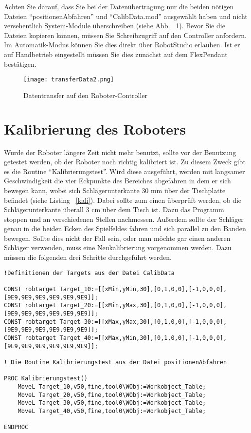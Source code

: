 Achten Sie darauf, dass Sie bei der Datenübertragung nur die beiden nötigen Dateien \enquote{positionenAbfahren} und \enquote{CalibData.mod} ausgewählt haben und nicht versehentlich System-Module überschreiben (siehe Abb. ~\ref{transfer}). Bevor Sie die Dateien kopieren können, müssen Sie Schreibzugriff auf den Controller anfordern. Im Automatik-Modus können Sie dies direkt über RobotStudio erlauben. Ist er auf Handbetrieb eingestellt müssen Sie dies zunächst auf dem FlexPendant bestätigen.

\begin{figure}[htbp]
\centering
\texttt{[image: transferData2.png]}
\caption{Datentransfer auf den Roboter-Controller} 
\label{transfer}
\end{figure}
   

\section{Kalibrierung des Roboters}
Wurde der Roboter längere Zeit nicht mehr benutzt, sollte vor der Benutzung getestet werden, ob der Roboter noch richtig kalibriert ist. Zu diesem Zweck gibt es die Routine \enquote{Kalibrierungstest}. Wird diese ausgeführt, werden mit langsamer Geschwindigkeit die vier Eckpunkte des Bereiches abgefahren in dem er sich bewegen kann, wobei sich Schlägerunterkante 30 mm über der Tischplatte befindet (siehe Listing ~\ref{kali}). Dabei sollte zum einen überprüft werden, ob die Schlägerunterkante überall 3 cm über dem Tisch ist. Dazu das Programm stoppen und an verschiedenen Stellen nachmessen. Außerdem sollte der Schläger genau in die beiden Ecken des Spielfeldes fahren und sich parallel zu den Banden bewegen. Sollte dies nicht der Fall sein, oder man möchte gar einen anderen Schläger verwenden, muss eine Neukalibrierung vorgenommen werden. Dazu müssen die folgenden drei Schritte durchgeführt werden.

\begin{lstlisting}[caption=RAPID-Routine: Kalibrierungstest, label=kali]
!Definitionen der Targets aus der Datei CalibData

CONST robtarget Target_10:=[[xMin,yMin,30],[0,1,0,0],[-1,0,0,0],[9E9,9E9,9E9,9E9,9E9,9E9]];
CONST robtarget Target_20:=[[xMin,yMax,30],[0,1,0,0],[-1,0,0,0],[9E9,9E9,9E9,9E9,9E9,9E9]]; 
CONST robtarget Target_30:=[[xMax,yMax,30],[0,1,0,0],[-1,0,0,0],[9E9,9E9,9E9,9E9,9E9,9E9]];
CONST robtarget Target_40:=[[xMax,yMin,30],[0,1,0,0],[-1,0,0,0],[9E9,9E9,9E9,9E9,9E9,9E9]]; 

! Die Routine Kalibrierungstest aus der Datei positionenAbfahren

PROC Kalibrierungstest()
	MoveL Target_10,v50,fine,tool0\WObj:=Workobject_Table;
   	MoveL Target_20,v50,fine,tool0\WObj:=Workobject_Table;
    MoveL Target_30,v50,fine,tool0\WObj:=Workobject_Table; 
    MoveL Target_40,v50,fine,tool0\WObj:=Workobject_Table; 
        
ENDPROC
\end{lstlisting}

